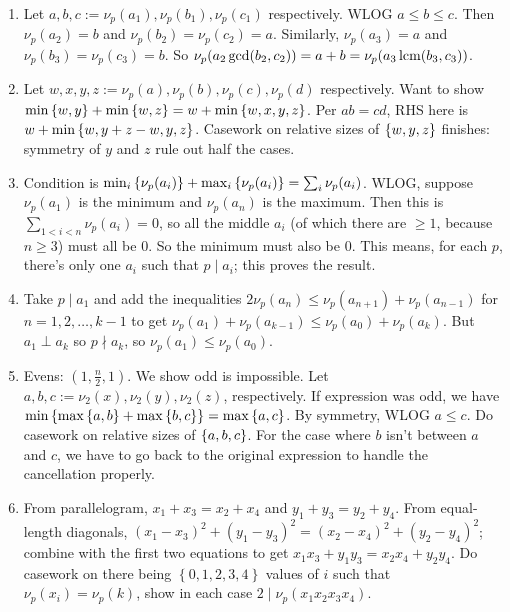 \documentclass[11pt,paper=letter]{scrartcl}
\begin{document}
\begin{enumerate}

\item Let $a, b, c := \nu_p(a_1), \nu_p(b_1), \nu_p(c_1)$ respectively. WLOG $a \le b \le c$. Then $\nu_p(a_2) = b$ and $\nu_p(b_2) = \nu_p(c_2) = a$. Similarly, $\nu_p(a_3) = a$ and $\nu_p(b_3) = \nu_p(c_3) = b$. So $\nu_p(a_2 \gcd(b_2, c_2)) = a + b = \nu_p(a_3 \operatorname*{lcm}(b_3, c_3))$.

\item Let $w, x, y, z := \nu_p(a), \nu_p(b), \nu_p(c), \nu_p(d)$ respectively. Want to show $\min\left\{ w, y \right\} + \min\left\{ w, z \right\} = w + \min\left\{ w, x, y, z \right\}$. Per $ab = cd$, RHS here is $w + \min\left\{ w, y + z - w, y, z \right\}$. Casework on relative sizes of $\left\{ w, y, z \right\}$ finishes: symmetry of $y$ and $z$ rule out half the cases.

\item Condition is $\min_i\left\{ \nu_p(a_i) \right\} + \max_i\left\{ \nu_p(a_i) \right\} = \sum_i \nu_p(a_i)$. WLOG, suppose $\nu_p(a_1)$ is the minimum and $\nu_p(a_n)$ is the maximum. Then this is $\sum_{1 < i < n} \nu_p(a_i) = 0$, so all the middle $a_i$ (of which there are $\ge 1$, because $n \ge 3$) must all be $0$. So the minimum must also be $0$. This means, for each $p$, there's only one $a_i$ such that $p \mid a_i$; this proves the result.

\item Take $p \mid a_1$ and add the inequalities $2 \nu_p(a_n) \le \nu_p(a_{n+1}) + \nu_p(a_{n-1})$ for $n = 1, 2, \ldots, k-1$ to get $\nu_p(a_1) + \nu_p(a_{k - 1}) \le \nu_p(a_0) + \nu_p(a_k)$. But $a_1 \perp a_k$ so $p \nmid a_k$, so $\nu_p(a_1) \le \nu_p(a_0)$.

\item Evens: $(1, \frac{n}{2}, 1)$. We show odd is impossible. Let $a, b, c := \nu_2(x), \nu_2(y), \nu_2(z)$, respectively. If expression was odd, we have $\min\left\{  \max\left\{ a, b \right\} + \max\left\{ b, c \right\}  \right\} = \max\left\{ a, c \right\}$. By symmetry, WLOG $a \le c$. Do casework on relative sizes of $\left\{ a, b, c \right\}$. For the case where $b$ isn't between $a$ and $c$, we have to go back to the original expression to handle the cancellation properly.

\item From parallelogram, $ x_1 + x_3 = x_2 + x_4 $ and $ y_1 + y_3 = y_2 + y_4 $. From equal-length diagonals, $ (x_1 - x_3 )^2 + (y_1 - y_3 )^2 = (x_2 - x_4 )^2 + (y_2 - y_4 )^2 $; combine with the first two equations to get $x_1x_3 + y_1y_3 = x_2x_4 + y_2y_4$. Do casework on there being $ \left\{ 0, 1, 2, 3, 4 \right\} $ values of $i$ such that $ \nu_p(x_i ) = \nu_p(k) $, show in each case $2 \mid \nu_p(x_1x_2x_3x_4)$.


\end{enumerate}
\end{document}
